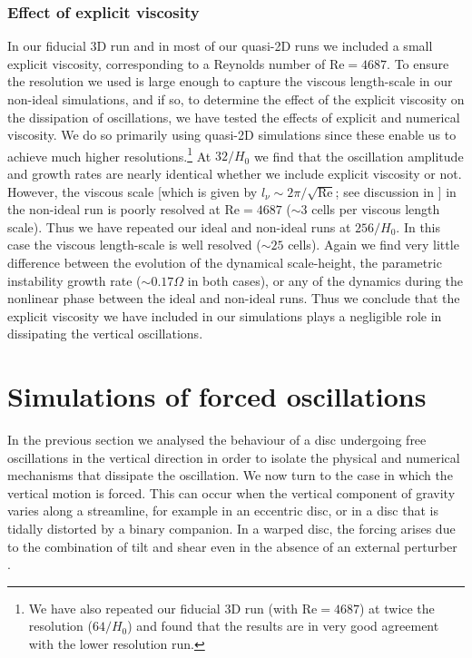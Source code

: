 \documentclass[fleqn,usenatbib]{mnras}
\begin{document}
\subsubsection{Effect of explicit viscosity}
In our fiducial 3D run and in most of our quasi-2D runs we included a small explicit viscosity, corresponding to a Reynolds number of $\text{Re} = 4687$. To ensure the resolution we used is large enough to capture the viscous length-scale in our non-ideal simulations, and if so, to determine the effect of the explicit viscosity on the dissipation of oscillations, we have tested the effects of explicit and numerical viscosity. We do so primarily using quasi-2D simulations since these enable us to achieve much higher resolutions.\footnote{We have also repeated our fiducial 3D run (with $\text{Re} = 4687$) at twice the resolution ($64/H_0$) and found that the results are in very good agreement with the lower resolution run.} At $32/H_0$ we find that the oscillation amplitude and growth rates are nearly identical whether we include explicit viscosity or not. However, the viscous scale [which is given by $l_{\nu} \sim 2\pi/\sqrt{\text{Re}}$; see discussion in \cite{heldmamatsashvili2022}] in the non-ideal run is poorly resolved at $\text{Re}=4687$ ($\sim 3$ cells per viscous length scale). Thus we have repeated our ideal and non-ideal runs at $256/H_0$. In this case the viscous length-scale is well resolved ($\sim 25$ cells). Again we find very little difference between the evolution of the dynamical scale-height, the parametric instability growth rate ($\sim 0.17\Omega$ in both cases), or any of the dynamics during the nonlinear phase between the ideal and non-ideal runs. Thus we conclude that the explicit viscosity we have included in our simulations plays a negligible role in dissipating the vertical oscillations.

\section{Simulations of forced oscillations}
\label{RESULTS_ForcedBounceSimulations}
In the previous section we analysed the behaviour of a disc undergoing free oscillations in the vertical direction in order to isolate the physical and numerical mechanisms that dissipate the oscillation. We now turn to the case in which the vertical motion is forced. This can occur when the vertical component of gravity varies along a streamline, for example in an eccentric disc, or in a disc that is tidally distorted by a binary companion.
In a warped disc, the forcing arises due to the combination of tilt and shear even in the absence of an external perturber \citep{ogilvie2013local,fairbairn2021non}.
\end{document}
